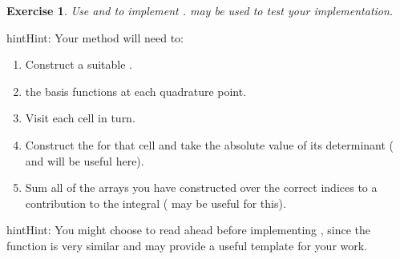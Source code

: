 \documentclass{book}
\newtheorem{exercise}{Exercise}
\begin{document}
\begin{exercise}
Use {\hyperref[\detokenize{5_functions:equation-integral_sum}]{}} and {\hyperref[\detokenize{5_functions:equation-integration}]{}} to implement
.
 may be used to test your
implementation.
\end{exercise}
\begin{sphinxadmonition}{hint}{Hint:}
Your method will need to:
\begin{enumerate}
\item {} 
Construct a suitable .

\item {} 
 the
basis functions at each quadrature point.

\item {} 
Visit each cell in turn.

\item {} 
Construct the  for that cell
and take the absolute value of its determinant (
and  will be useful here).

\item {} 
Sum all of the arrays you have constructed over the correct
indices to a contribution to the integral (
may be useful for this).

\end{enumerate}
\end{sphinxadmonition}

\begin{sphinxadmonition}{hint}{Hint:}
You might choose to read ahead before implementing
, since the
 function is very similar and may provide a useful
template for your work.
\end{sphinxadmonition}
\end{document}
